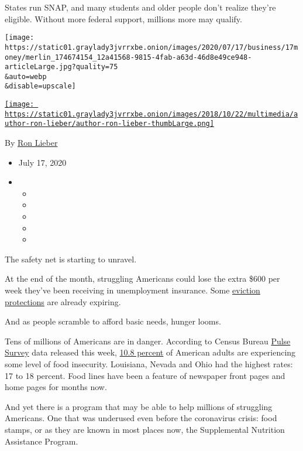 States run SNAP, and many students and older people don't realize
they're eligible. Without more federal support, millions more may
qualify.

\texttt{[image: https://static01.graylady3jvrrxbe.onion/images/2020/07/17/business/17money/merlin\_174674154\_12a41568-9815-4fab-a63d-46d8e49ce948-articleLarge.jpg?quality=75\\\&auto=webp\\\&disable=upscale]}

\href{https://www.nytimes3xbfgragh.onion/by/ron-lieber}{\texttt{[image: https://static01.graylady3jvrrxbe.onion/images/2018/10/22/multimedia/author-ron-lieber/author-ron-lieber-thumbLarge.png]}}

By \href{https://www.nytimes3xbfgragh.onion/by/ron-lieber}{Ron Lieber}

\begin{itemize}
\item
  July 17, 2020
\item
  \begin{itemize}
  \item
  \item
  \item
  \item
  \item
  \end{itemize}
\end{itemize}

The safety net is starting to unravel.

At the end of the month, struggling Americans could lose the extra \$600
per week they've been receiving in unemployment insurance. Some
\href{https://www.nytimes3xbfgragh.onion/2020/07/11/your-money/coronavirus-eviction-prevention-renters-landlord.html}{eviction
protections} are already expiring.

And as people scramble to afford basic needs, hunger looms.

Tens of millions of Americans are in danger. According to Census Bureau
\href{https://www.census.gov/householdpulsedata}{Pulse Survey} data
released this week,
\href{https://www.census.gov/data-tools/demo/hhp/\#/?measures=FIR}{10.8
percent} of American adults are experiencing some level of food
insecurity. Louisiana, Nevada and Ohio had the highest rates: 17 to 18
percent. Food lines have been a feature of newspaper front pages and
home pages for months now.

And yet there is a program that may be able to help millions of
struggling Americans. One that was underused even before the coronavirus
crisis: food stamps, or as they are known in most places now, the
Supplemental Nutrition Assistance Program.

